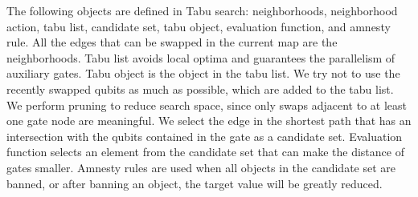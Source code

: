\documentclass[journal]{IEEEtran}
\begin{document}
	
	The following objects are defined in Tabu search: neighborhoods, neighborhood action, tabu list, candidate set, tabu object, evaluation function, and amnesty rule. All the edges that can be swapped in the current map are the neighborhoods. Tabu list avoids local optima and guarantees the parallelism of auxiliary gates. Tabu object is the object in the tabu list. We try not to use the recently swapped qubits as much as possible, which are added to the tabu list. We perform pruning to reduce search space, since only swaps adjacent to at least one gate node are meaningful. We select the edge in the shortest path that has an intersection with the qubits contained in the gate as a candidate set. Evaluation function selects an element from the candidate set that can make the distance of gates smaller. Amnesty rules are used when all objects in the candidate set are banned,  or after banning an object, the target value will be greatly reduced.
	
\end{document}
